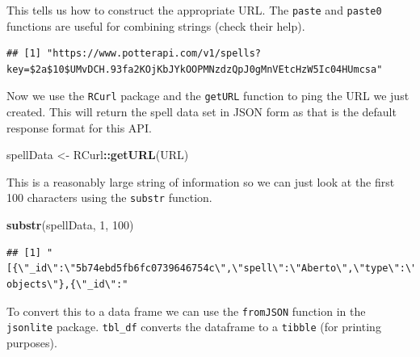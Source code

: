 \documentclass[
]{book}
\newenvironment{Shaded}{\begin{snugshade}}{\end{snugshade}}
\newcommand{\DecValTok}[1]{\textcolor[rgb]{0.00,0.00,0.81}{#1}}
\newcommand{\KeywordTok}[1]{\textcolor[rgb]{0.13,0.29,0.53}{\textbf{#1}}}
\newcommand{\NormalTok}[1]{#1}
\newcommand{\OperatorTok}[1]{\textcolor[rgb]{0.81,0.36,0.00}{\textbf{#1}}}
\newcommand{\StringTok}[1]{\textcolor[rgb]{0.31,0.60,0.02}{#1}}
\theoremstyle{definition}
\theoremstyle{definition}
\theoremstyle{definition}
\theoremstyle{remark}
\begin{document}
This tells us how to construct the appropriate URL. The \texttt{paste} and \texttt{paste0} functions are useful for combining strings (check their help).

\begin{Shaded}
\end{Shaded}

\begin{verbatim}
## [1] "https://www.potterapi.com/v1/spells?key=$2a$10$UMvDCH.93fa2KOjKbJYkOOPMNzdzQpJ0gMnVEtcHzW5Ic04HUmcsa"
\end{verbatim}

Now we use the \texttt{RCurl} package and the \texttt{getURL} function to ping the URL we just created. This will return the spell data set in JSON form as that is the default response format for this API.

\begin{Shaded}
\begin{Highlighting}[]
\NormalTok{spellData <-}\StringTok{ }\NormalTok{RCurl}\OperatorTok{::}\KeywordTok{getURL}\NormalTok{(URL)}
\end{Highlighting}
\end{Shaded}

This is a reasonably large string of information so we can just look at the first 100 characters using the \texttt{substr} function.

\begin{Shaded}
\begin{Highlighting}[]
\KeywordTok{substr}\NormalTok{(spellData, }\DecValTok{1}\NormalTok{, }\DecValTok{100}\NormalTok{) }
\end{Highlighting}
\end{Shaded}

\begin{verbatim}
## [1] "[{\"_id\":\"5b74ebd5fb6fc0739646754c\",\"spell\":\"Aberto\",\"type\":\"Charm\",\"effect\":\"opens objects\"},{\"_id\":"
\end{verbatim}

To convert this to a data frame we can use the \texttt{fromJSON} function in the \texttt{jsonlite} package. \texttt{tbl\_df} converts the dataframe to a \texttt{tibble} (for printing purposes).
\end{document}
